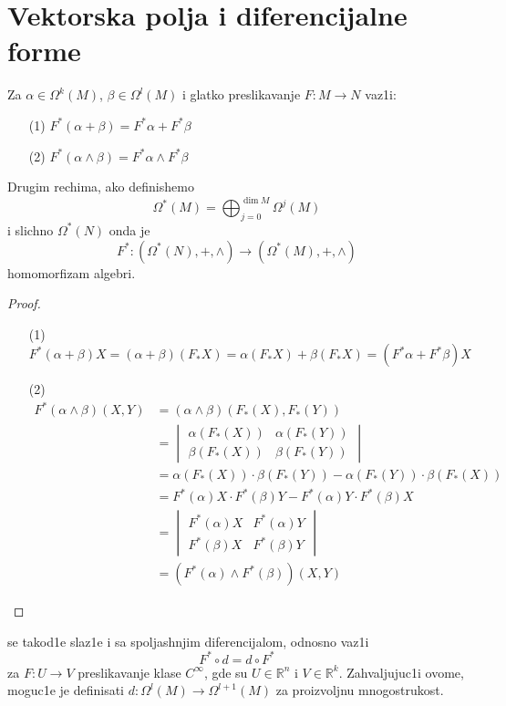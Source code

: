 \documentclass[a4paper,12pt]{article}
\newcommand{\latin}{\fontencoding{T1}\selectfont}
\newcommand{\RR}{\mathbb{R}}
\begin{document}
\section{Vektorska polja i diferencijalne forme}

\begin{tvr}
Za $\alpha \in \Omega^k(M)$, $\beta \in \Omega^l(M)$ i glatko preslikavanje $F: M \to N$ vaz1i:
\begin{itemize}
\item[(1)] $F^* (\alpha + \beta) = F^* \alpha + F^* \beta$
\item[(2)] $F^* (\alpha \wedge \beta) = F^* \alpha \wedge F^* \beta$
\end{itemize}
Drugim rechima, ako definishemo \[\Omega^*(M) = \bigoplus^{\dim M}_{j=0} \Omega^j (M)\] i slichno $\Omega^*(N) $ onda je 
\[F^*: (\Omega^*(N), +, \wedge) \to (\Omega^*(M), +, \wedge)\]
homomorfizam algebri.
\end{tvr}

\begin{proof}
\begin{itemize}
\item[(1)] $F^*(\alpha + \beta) X = (\alpha + \beta) (F_* X) = \alpha(F_* X) + \beta(F_* X) = (F^* \alpha + F^* \beta) X$
\item[(2)]
\begin{align*}
 F^* (\alpha \wedge \beta) (X,Y) &= (\alpha \wedge \beta) (F_* (X), F_* (Y)) \\
 &= \begin{vmatrix} \alpha(F_*(X)) & \alpha(F_*(Y)) \\ \beta(F_*(X)) & \beta(F_*(Y)) \end{vmatrix} \\
 &= \alpha(F_*(X))\cdot \beta(F_*(Y)) - \alpha(F_*(Y)) \cdot \beta(F_*(X)) \\
 &= F^*(\alpha) X \cdot F^*(\beta) Y - F^*(\alpha) Y \cdot F^*(\beta) X \\
 &=  \begin{vmatrix} F^*(\alpha)X & F^*(\alpha)Y \\ F^*(\beta)X & F^*(\beta)Y \end{vmatrix} \\
 &= (F^*(\alpha) \wedge F^*(\beta))(X,Y)
\end{align*}
\end{itemize}
\end{proof}

\begin{nap} \latin{Pullback} \selectfont se takod1e slaz1e i sa spoljashnjim diferencijalom, odnosno vaz1i \[F^* \circ d  = d \circ F^* \]
za $F: U \to V$ preslikavanje klase $C^{\infty}$, gde su $U \in \RR^n$ i $V \in \RR^k$.
 Zahvaljujuc1i ovome, moguc1e je definisati $d: \Omega^l(M) \to \Omega^{l+1}(M)$ za proizvoljnu mno\-go\-stru\-kost. 
\end{nap}
\\ \\
\end{document}
